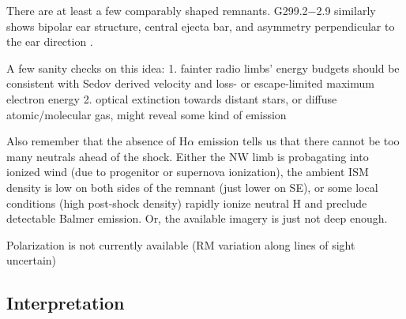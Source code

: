 \documentclass[twocolumn,tighten,trackchanges]{aastex61}
\begin{document}
There are at least a few comparably shaped remnants.
G299.2$-$2.9 similarly shows bipolar ear structure, central ejecta bar, and
asymmetry perpendicular to the ear direction \citep{post2014}.

A few sanity checks on this idea:
1. fainter radio limbs' energy budgets should be consistent with Sedov derived
velocity and loss- or escape-limited maximum electron energy
2. optical extinction towards distant stars, or diffuse atomic/molecular gas,
might reveal some kind of emission

Also remember that the absence of H$\alpha$ emission tells us that there cannot
be too many neutrals ahead of the shock.
Either the NW limb is probagating into ionized wind (due to progenitor or
supernova ionization), the ambient ISM density is low on both sides of the
remnant (just lower on SE), or some local conditions (high post-shock density)
rapidly ionize neutral H and preclude detectable Balmer emission.
Or, the available imagery is just not deep enough.

Polarization is not currently available (RM variation along lines of sight
uncertain)


\subsection{Interpretation}

\end{document}
